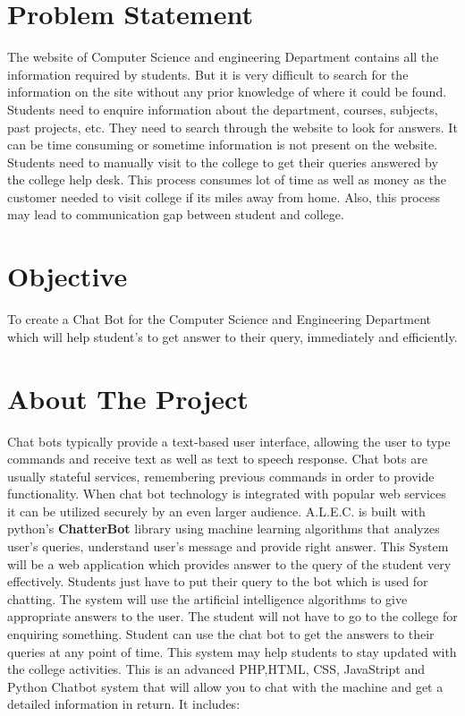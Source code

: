 \documentclass{mnnit}
\begin{document}
\section{Problem Statement}
The website of Computer Science and engineering Department contains all the
information required by students. But it is very difficult to search for the
information on the site without any prior knowledge of where it could be found.
Students need to enquire information about the department, courses, subjects,
past projects, etc. They need to search through the website to look for answers.
It can be time consuming or sometime information is not present on the website.
Students need to manually visit to the college to get their queries answered by
the college help desk. This process consumes lot of time as well as money as the
customer needed to visit college if its miles away from home. Also, this process
may lead to communication gap between student and college.

\section{Objective}
To create a Chat Bot for the Computer Science and Engineering Department which
will help student's to get answer to their query, immediately and efficiently.

\section{About The Project}
Chat bots typically provide a text-based user interface, allowing the user to
type commands and receive text as well as text to speech response. Chat bots are
usually stateful services, remembering previous commands in order to provide
functionality. When chat bot technology is integrated with popular web services
it can be utilized securely by an even larger audience.
\vspace{10pt}
\newline
A.L.E.C. is built with python's \textbf{ChatterBot} library using machine
learning algorithms that analyzes user's queries, understand user's message and
provide right answer. This System will be a web application which provides answer
to the query of the student very effectively. Students just have to put their
query to the bot which is used for chatting. The system will use the artificial
intelligence algorithms to give appropriate answers to the user. The student will
not have to go to the college for enquiring something. Student can use the chat
bot to get the answers to their queries at any point of time. This system may
help students to stay updated with the college activities.
\vspace{10pt}
\newline
This is an advanced PHP,HTML, CSS, JavaStript and Python Chatbot system that
will allow you to chat with the machine and get a detailed information in return.
It includes:
\end{document}
